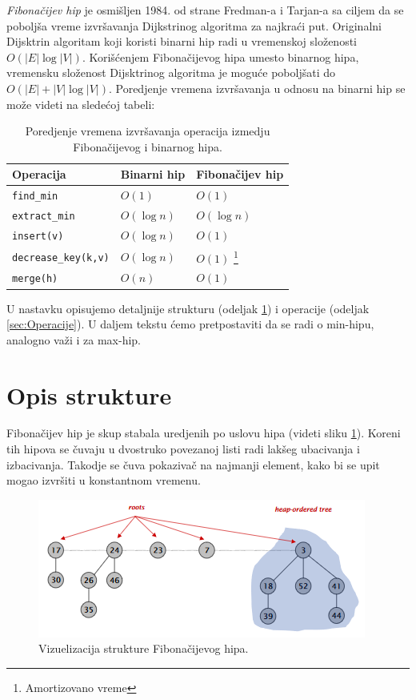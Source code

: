 \documentclass[a4paper]{article}
\theoremstyle{plain}
\theoremstyle{definition}
\begin{document}
\emph{Fibona\v{c}ijev hip} \cite{Book} je osmi\v{s}ljen 1984. od strane Fredman-a i Tarjan-a sa ciljem da se pobolj\v{s}a vreme izvr\v{s}avanja Dijkstrinog algoritma za najkra\'c{}i put. Originalni Dijsktrin algoritam koji koristi binarni hip radi u vremenskoj slo\v{z}enosti $O(|E|\log{|V|})$. Kori\v{s}\'c{}enjem Fibona\v{c}ijevog hipa umesto binarnog hipa, vremensku slo\v{z}enost Dijsktrinog algoritma je mogu\'c{}e pobolj\v{s}ati do $O(|E| + |V|\log{|V|})$. Poredjenje vremena izvr\v{s}avanja u odnosu na binarni hip se mo\v{z}e videti na slede\'c{}oj tabeli:

\begin{table}[H]
\centering
\begin{tabular}{|l|l|l|}
    \hline
    Operacija                   & Binarni hip  & Fibona\v{c}ijev hip \\
    \hline
    \texttt{find\_min}          & $O(1)$       & $O(1)$              \\
    \texttt{extract\_min}       & $O(\log{n})$ & $O(\log{n})$        \\
    \texttt{insert(v)}          & $O(\log{n})$ & $O(1)$              \\
    \texttt{decrease\_key(k,v)} & $O(\log{n})$ & $O(1)$ \footnote{Amortizovano vreme} \\
    \texttt{merge(h)}           & $O(n)$       & $O(1)$              \\
    \hline
\end{tabular}
\label{tbl:fig1}
\caption{Poredjenje vremena izvr\v{s}avanja operacija izmedju Fibona\v{c}ijevog i binarnog hipa.}
\end{table}

U nastavku opisujemo detaljnije strukturu (odeljak \ref{sec:Struktura}) i operacije (odeljak \ref{sec:Operacije}). U daljem tekstu \'c{}emo pretpostaviti da se radi o min-hipu, analogno va\v{z}i i za max-hip.


\section{Opis strukture}
\label{sec:Struktura}

Fibona\v{c}ijev hip je skup stabala uredjenih po uslovu hipa (videti sliku \ref{fig1}). Koreni tih hipova se \v{c}uvaju u dvostruko povezanoj listi radi lak\v{s}eg ubacivanja i izbacivanja. Takodje se \v{c}uva pokaziva\v{c} na najmanji element, kako bi se upit mogao izvr\v{s}iti u konstantnom vremenu. 

\begin{figure}[H]
    \centering
    \includegraphics[scale=0.6]{resources/fig1.PNG}
    \caption{Vizuelizacija strukture Fibona\v{c}ijevog hipa.}
    \label{fig1}
\end{figure}
\end{document}
